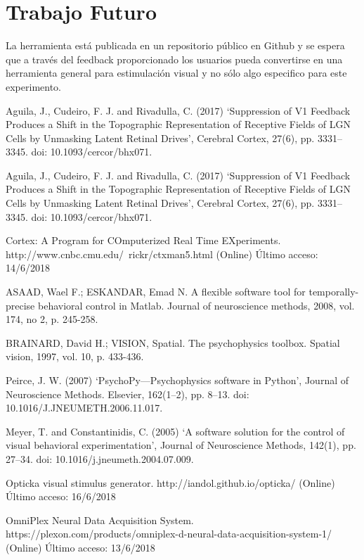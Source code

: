 \documentclass[conference]{IEEEtran}
\begin{document}
\section{Trabajo Futuro}


La herramienta está publicada en un repositorio público en Github\cite{stimpackrepo} y se espera que a través del feedback proporcionado los usuarios pueda convertirse en una herramienta general para estimulación visual y no sólo algo especifico para este experimento.


\begin{thebibliography}{00}
 Aguila, J., Cudeiro, F. J. and Rivadulla, C. (2017) ‘Suppression of V1 Feedback Produces a Shift in the Topographic Representation of Receptive Fields of LGN Cells by Unmasking Latent Retinal Drives’, Cerebral Cortex, 27(6), pp. 3331–3345. doi: 10.1093/cercor/bhx071.

 Aguila, J., Cudeiro, F. J. and Rivadulla, C. (2017) ‘Suppression of V1 Feedback Produces a Shift in the Topographic Representation of Receptive Fields of LGN Cells by Unmasking Latent Retinal Drives’, Cerebral Cortex, 27(6), pp. 3331–3345. doi: 10.1093/cercor/bhx071.

 Cortex: A Program for COmputerized Real Time EXperiments. http://www.cnbc.cmu.edu/~rickr/ctxman5.html (Online) Último acceso: 14/6/2018


ASAAD, Wael F.; ESKANDAR, Emad N. A flexible software tool for temporally-precise behavioral control in Matlab. Journal of neuroscience methods, 2008, vol. 174, no 2, p. 245-258.


 BRAINARD, David H.; VISION, Spatial. The psychophysics toolbox. Spatial vision, 1997, vol. 10, p. 433-436.

 Peirce, J. W. (2007) ‘PsychoPy—Psychophysics software in Python’, Journal of Neuroscience Methods. Elsevier, 162(1–2), pp. 8–13. doi: 10.1016/J.JNEUMETH.2006.11.017.

 Meyer, T. and Constantinidis, C. (2005) ‘A software solution for the control of visual behavioral experimentation’, Journal of Neuroscience Methods, 142(1), pp. 27–34. doi: 10.1016/j.jneumeth.2004.07.009.

 Opticka visual stimulus generator. http://iandol.github.io/opticka/ (Online) Último acceso: 16/6/2018


 OmniPlex Neural Data Acquisition System. https://plexon.com/products/omniplex-d-neural-data-acquisition-system-1/ (Online) Último acceso: 13/6/2018


\end{thebibliography}
\end{document}
